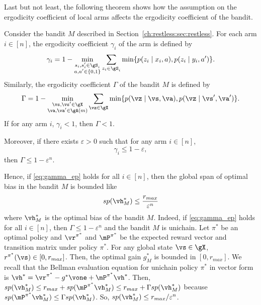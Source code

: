 Last but not least, the following theorem shows how the assumption on the ergodicity coefficient of local arms affects the ergodicity coefficient of the bandit.
\begin{thm}
    \label{thm:ergodicity_coeff}
    Consider the bandit $M$ described in Section~\ref{ch:restless:sec:restless}.
    For each arm $i\in[n]$, the ergodicity coefficient $\gamma_i$ of the arm is defined by
    \begin{align*}
        \gamma_i = 1-\min_{\substack{s_i,s'_i\in\gS_i \\a,a'\in\{0,1\}}} \sum_{z_i\in\gS_i} \min\{p(z_i \mid x_i, a), p(z_i \mid y_i, a')\}.
    \end{align*}
    Similarly, the ergodicity coefficient $\Gamma$ of the bandit $M$ is defined by
    \begin{align*}
        \Gamma = 1-\min_{\substack{\vs,\vs'\in\gX \\\va,\va'\in\gA(m)}} \sum_{\vz\in\gX} \min\{p(\vz \mid \vs, \va), p(\vz \mid \vs', \va')\}.
    \end{align*}
    If for any arm $i$, $\gamma_i<1$, then $\Gamma<1$.

    Moreover, if there exists $\varepsilon>0$ such that for any arm $i\in[n]$,
    \begin{equation}
        \label{eq:gamma_ep}
        \gamma_i \le 1-\varepsilon,
    \end{equation}
    then $\Gamma \le 1-\varepsilon^n$.
\end{thm}
Hence, if \eqref{eq:gamma_ep} holds for all $i\in[n]$, then the global span of optimal bias in the bandit $M$ is bounded like 
\begin{align}
    sp(\vh^*_M)\le \frac{r_{max}}{\varepsilon^n} \label{eq:span_expo}
\end{align}
where $\vh^*_M$ is the optimal bias of the bandit $M$.
Indeed, if \eqref{eq:gamma_ep} holds for all $i\in[n]$, then $\Gamma \le 1-\varepsilon^n$ and the bandit $M$ is unichain.
Let $\pi^*$ be an optimal policy and $\vr^{\pi^*}$ and $\mP^{\pi^*}$ be the expected reward vector and transition matrix under policy $\pi^*$.
For any global state $\vs\in\gX$, $r^{\pi^*}(\vs)\in[0,r_{max}]$.
Then, the optimal gain $g^*_M$ is bounded in $[0, r_{max}]$.
We recall that the Bellman evaluation equation for unichain policy $\pi^*$ in vector form is $\vh^*=\vr^{\pi^*} - g^*\vone +\mP^{\pi^*}\vh^*$.
Then, $sp(\vh^*_M)\le r_{max} +sp(\mP^{\pi^*}\vh^*_M)\le r_{max} +\Gamma sp(\vh^*_M)$ because $sp(\mP^{\pi^*}\vh^*_M)\le \Gamma sp(\vh^*_M)$.
So, $sp(\vh^*_M)\le r_{max}/\varepsilon^n$.


